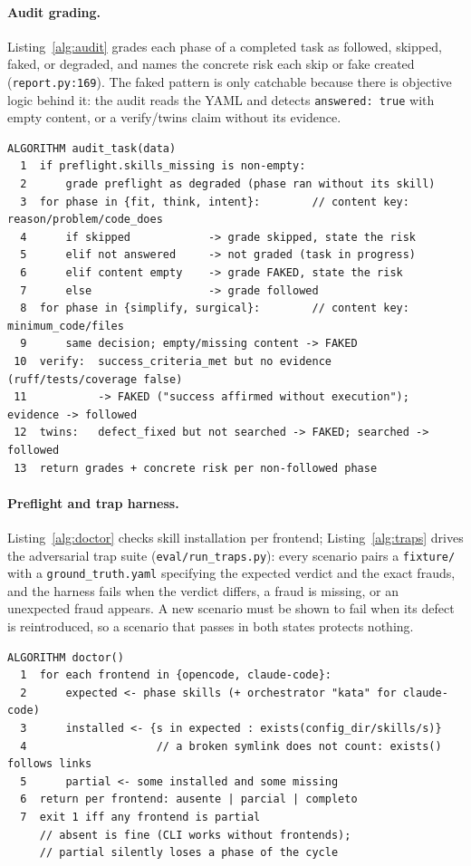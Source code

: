 \documentclass{sbc2019}%
\begin{document}
\paragraph{Audit grading.} Listing~\ref{alg:audit} grades each phase of a
completed task as followed, skipped, faked, or degraded, and names the
concrete risk each skip or fake created (\texttt{report.py:169}). The faked
pattern is only catchable because there is objective logic behind it: the
audit reads the YAML and detects \texttt{answered: true} with empty
content, or a verify/twins claim without its evidence.

\begin{lstlisting}[caption=audit grading (kata/report.py).,label=alg:audit]
ALGORITHM audit_task(data)
  1  if preflight.skills_missing is non-empty:
  2      grade preflight as degraded (phase ran without its skill)
  3  for phase in {fit, think, intent}:        // content key: reason/problem/code_does
  4      if skipped            -> grade skipped, state the risk
  5      elif not answered     -> not graded (task in progress)
  6      elif content empty    -> grade FAKED, state the risk
  7      else                  -> grade followed
  8  for phase in {simplify, surgical}:        // content key: minimum_code/files
  9      same decision; empty/missing content -> FAKED
 10  verify:  success_criteria_met but no evidence (ruff/tests/coverage false)
 11           -> FAKED ("success affirmed without execution"); evidence -> followed
 12  twins:   defect_fixed but not searched -> FAKED; searched -> followed
 13  return grades + concrete risk per non-followed phase
\end{lstlisting}

\paragraph{Preflight and trap harness.} Listing~\ref{alg:doctor} checks
skill installation per frontend; Listing~\ref{alg:traps} drives the
adversarial trap suite (\texttt{eval/run\_traps.py}): every scenario pairs
a \texttt{fixture/} with a \texttt{ground\_truth.yaml} specifying the
expected verdict and the exact frauds, and the harness fails when the
verdict differs, a fraud is missing, or an unexpected fraud appears. A new
scenario must be shown to fail when its defect is reintroduced, so a
scenario that passes in both states protects nothing.

\begin{lstlisting}[caption=preflight doctor (kata/skills.py).,label=alg:doctor]
ALGORITHM doctor()
  1  for each frontend in {opencode, claude-code}:
  2      expected <- phase skills (+ orchestrator "kata" for claude-code)
  3      installed <- {s in expected : exists(config_dir/skills/s)}
  4                    // a broken symlink does not count: exists() follows links
  5      partial <- some installed and some missing
  6  return per frontend: ausente | parcial | completo
  7  exit 1 iff any frontend is partial
     // absent is fine (CLI works without frontends);
     // partial silently loses a phase of the cycle
\end{lstlisting}
\end{document}
